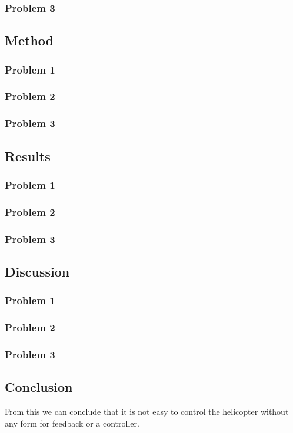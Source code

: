 \documentclass[12pt, a4paper]{article}%
\begin{document}
\subsubsection*{Problem 3}

\subsection*{Method}
\subsubsection*{Problem 1}
\subsubsection*{Problem 2}
\subsubsection*{Problem 3}

\subsection*{Results}
\subsubsection*{Problem 1}
\subsubsection*{Problem 2}
\subsubsection*{Problem 3}

\subsection*{Discussion}
\subsubsection*{Problem 1}
\subsubsection*{Problem 2}
\subsubsection*{Problem 3}

\subsection*{Conclusion}
From this we can conclude that it is not easy to control the helicopter without any form for feedback or a controller. 
\end{document}
